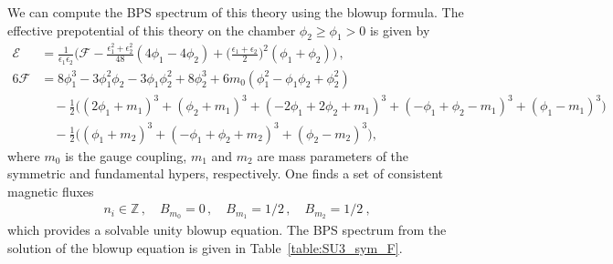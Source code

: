 We can compute the BPS spectrum of this theory using the blowup formula.
The effective prepotential of this theory on the chamber $\phi_2\ge\phi_1>0$  is given by
\begin{align}
\mathcal{E} & = \frac{1}{\epsilon_1 \epsilon_2} \bigg( \mathcal{F} - \frac{\epsilon_1^2 + \epsilon_2^2}{48} (4\phi_1 - 4\phi_2) + \Big(\frac{\epsilon_1 + \epsilon_2}{2}\Big)^2 (\phi_1 + \phi_2)\bigg) \,, \nonumber \\
6\mathcal{F}
&= 8\phi_1^3 - 3\phi_1^2 \phi_2 - 3\phi_1 \phi_2^2 + 8\phi_2^3 + 6m_0(\phi_1^2 - \phi_1 \phi_2 + \phi_2^2) \nonumber \\
& \quad - \frac{1}{2} \big((2\phi_1\! + \!m_1)^3 + (\phi_2 \!+\! m_1)^3 + (-2\phi_1 \!+\! 2\phi_2 + m_1)^3 + (-\phi_1 \!+\! \phi_2 - m_1)^3 + (\phi_1 \!-\! m_1)^3\big) \nonumber \\
& \quad - \frac{1}{2} \big( (\phi_1 + m_2)^3 + (-\phi_1 + \phi_2 + m_2)^3 + (\phi_2 - m_2)^3 \big),
\end{align}
where $ m_0 $ is the gauge coupling, $ m_1 $ and $ m_2 $ are mass parameters of the symmetric and fundamental hypers, respectively. 
One finds a set of consistent magnetic fluxes
\begin{align}
n_i \in \mathbb{Z} \, , \quad
B_{m_0} = 0 \, , \quad
B_{m_1} = 1/2 \, , \quad
B_{m_2} = 1/2 \ ,
\end{align}
which provides a solvable unity blowup equation. The BPS spectrum from the solution of the blowup equation is given in Table~\ref{table:SU3_sym_F}.
